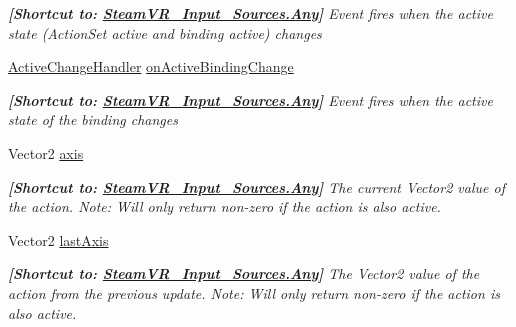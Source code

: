 \begin{DoxyCompactItemize}
\begin{DoxyCompactList}\small\item\em {\bfseries{\mbox{[}Shortcut to\+: \mbox{\hyperlink{namespace_valve_1_1_v_r_a82e5bf501cc3aa155444ee3f0662853faed36a1ef76a59ee3f15180e0441188ad}{Steam\+V\+R\+\_\+\+Input\+\_\+\+Sources.\+Any}}\mbox{]}}} Event fires when the active state (Action\+Set active and binding active) changes \end{DoxyCompactList}\item 
\mbox{\hyperlink{class_valve_1_1_v_r_1_1_steam_v_r___action___vector2_ad01c83284de71c0d9cd8f7e673ce5ab5}{Active\+Change\+Handler}} \mbox{\hyperlink{class_valve_1_1_v_r_1_1_steam_v_r___action___vector2_a0629b2634326464fc8ae3131e1c75ef4}{on\+Active\+Binding\+Change}}
\begin{DoxyCompactList}\small\item\em {\bfseries{\mbox{[}Shortcut to\+: \mbox{\hyperlink{namespace_valve_1_1_v_r_a82e5bf501cc3aa155444ee3f0662853faed36a1ef76a59ee3f15180e0441188ad}{Steam\+V\+R\+\_\+\+Input\+\_\+\+Sources.\+Any}}\mbox{]}}} Event fires when the active state of the binding changes \end{DoxyCompactList}\item 
Vector2 \mbox{\hyperlink{class_valve_1_1_v_r_1_1_steam_v_r___action___vector2_afd401d7d248459f2e074dc2b04f4bdc9}{axis}}
\begin{DoxyCompactList}\small\item\em {\bfseries{\mbox{[}Shortcut to\+: \mbox{\hyperlink{namespace_valve_1_1_v_r_a82e5bf501cc3aa155444ee3f0662853faed36a1ef76a59ee3f15180e0441188ad}{Steam\+V\+R\+\_\+\+Input\+\_\+\+Sources.\+Any}}\mbox{]}}} The current Vector2 value of the action. Note\+: Will only return non-\/zero if the action is also active. \end{DoxyCompactList}\item 
Vector2 \mbox{\hyperlink{class_valve_1_1_v_r_1_1_steam_v_r___action___vector2_abfaa7777e33e79208c25062cba77d687}{last\+Axis}}
\begin{DoxyCompactList}\small\item\em {\bfseries{\mbox{[}Shortcut to\+: \mbox{\hyperlink{namespace_valve_1_1_v_r_a82e5bf501cc3aa155444ee3f0662853faed36a1ef76a59ee3f15180e0441188ad}{Steam\+V\+R\+\_\+\+Input\+\_\+\+Sources.\+Any}}\mbox{]}}} The Vector2 value of the action from the previous update. Note\+: Will only return non-\/zero if the action is also active. \end{DoxyCompactList}\item 

\end{DoxyCompactItemize}
